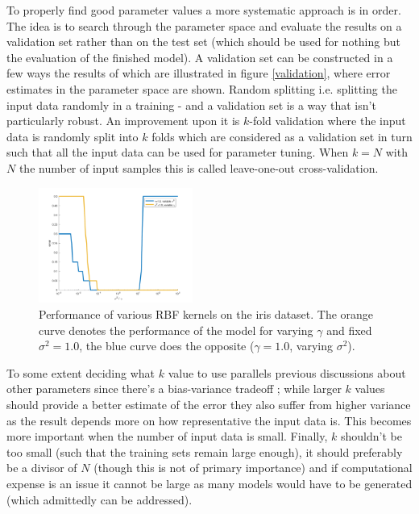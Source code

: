 \par To properly find good parameter values a more systematic approach is in order. The idea is to search through the parameter space and evaluate the results on a validation set rather than on the test set (which should be used for nothing but the evaluation of the finished model). A validation set can be constructed in a few ways the results of which are illustrated in figure \ref{validation}, where error estimates in the parameter space are shown. Random splitting i.e. splitting the input data randomly in a training - and a validation set is a way that isn't particularly robust. An improvement upon it is $k$-fold validation where the input data is randomly split into $k$ folds which are considered as a validation set in turn such that all the input data can be used for parameter tuning. When $k=N$ with $N$ the number of input samples this is called leave-one-out cross-validation. 

\begingroup
\setlength{\columnsep}{0.75cm}
\setlength{\intextsep}{0.2cm}
\begin{figure}
\centering
\includegraphics[width=0.45\textwidth]{../src/figures/iris/tuning}
\caption{Performance of various RBF kernels on the iris dataset. The orange curve denotes the performance of the model for varying $\gamma$ and fixed $\sigma^2=1.0$, the blue curve does the opposite ($\gamma=1.0$, varying $\sigma^2$).}
\label{iris2}
\end{figure}

\par To some extent deciding what $k$ value to use parallels previous discussions about other parameters since there's a bias-variance tradeoff ; while larger $k$ values should provide a better estimate of the error they also suffer from higher variance as the result depends more on how representative the input data is. This becomes more important when the number of input data is small. Finally, $k$ shouldn't be too small (such that the training sets remain large enough), it should preferably be a divisor of $N$ (though this is not of primary importance) and if computational expense is an issue it cannot be large as many models would have to be generated (which admittedly can be addressed).

